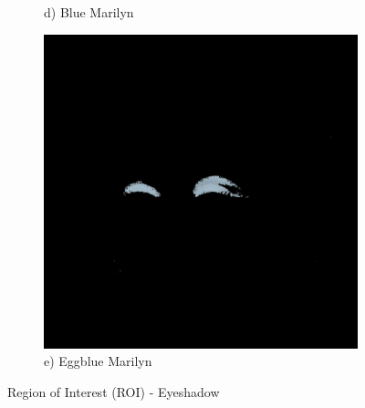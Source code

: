 \documentclass{article}
\begin{document}
\begin{figure}[htbp]
\begin{subfigure}[b]{0.19\textwidth}
        \caption*{d) Blue Marilyn}
    \end{subfigure}
    \hfill
    \begin{subfigure}[b]{0.19\textwidth}
        \includegraphics[width=\textwidth]{main_files/figure-latex/12_3_eggblue_marilyn_eyeshadow_extraction.jpg}
        \caption*{e) Eggblue Marilyn}
    \end{subfigure}
    
    \caption{Region of Interest (ROI) - Eyeshadow}
\end{figure}
\end{document}
